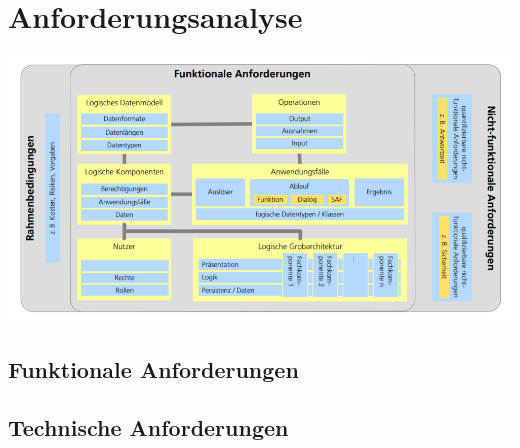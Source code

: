 \section{Anforderungsanalyse}

\includegraphics[width=\textwidth]{img/Uebersicht_Anforderungen.png}

\subsection{Funktionale Anforderungen}

\subsection{Technische Anforderungen}
